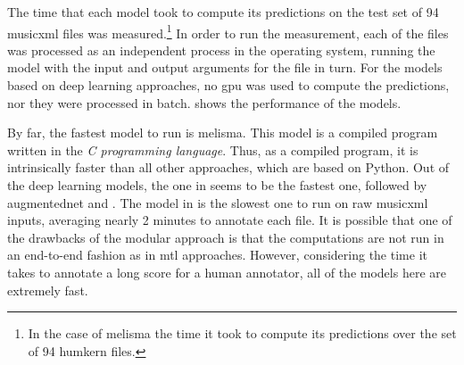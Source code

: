 
The time that each model took to compute its predictions on
the test set of 94 \gls{musicxml} files was
measured.\footnote{In the case of \gls{melisma} the time it
took to compute its predictions over the set of 94
\gls{humkern} files.} In order to run the measurement, each
of the files was processed as an independent process in the
operating system, running the model with the input and
output arguments for the file in turn. For the models based
on deep learning approaches, no \gls{gpu} was used to
compute the predictions, nor they were processed in batch.
 shows the performance of the
models.


By far, the fastest model to run is \gls{melisma}. This
model is a compiled program written in the \emph{C
programming language}. Thus, as a compiled program, it is
intrinsically faster than all other approaches, which are
based on Python. Out of the deep learning models, the one in
\textcite{micchi2021deep} seems to be the fastest one,
followed by \gls{augmentednet} and
\textcite{chen2021attend}. The model in
\textcite{mcleod2021modular} is the slowest one to run on
raw \gls{musicxml} inputs, averaging nearly 2 minutes to
annotate each file. It is possible that one of the drawbacks
of the modular approach is that the computations are not run
in an end-to-end fashion as in \gls{mtl} approaches.
However, considering the time it takes to annotate a long
score for a human annotator, all of the models here are
extremely fast.
